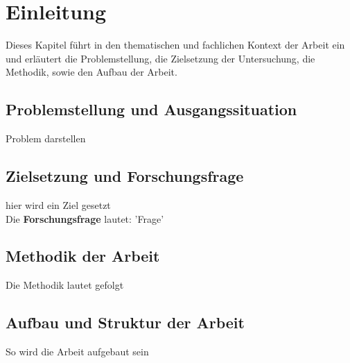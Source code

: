\chapter{Einleitung}
\label{chapter:kapitel1}

Dieses Kapitel führt in den thematischen und fachlichen Kontext der Arbeit ein und erläutert
die Problemstellung, die Zielsetzung der Untersuchung, die Methodik, sowie den Aufbau der Arbeit.



\section{Problemstellung und Ausgangssituation}
\label{section:problemstellung}

Problem darstellen

\section{Zielsetzung und Forschungsfrage}
\label{section:zielsetzung}

hier wird ein Ziel gesetzt \\
Die \textbf{Forschungsfrage} lautet: 'Frage'


\section{Methodik der Arbeit}
\label{section:methodik}

Die Methodik lautet gefolgt

\section{Aufbau und Struktur der Arbeit}
\label{section:struktur}

So wird die Arbeit aufgebaut sein